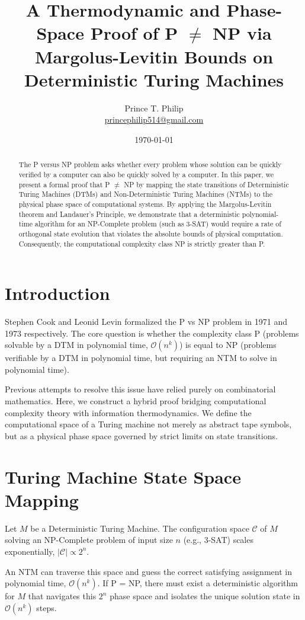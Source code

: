 \documentclass[12pt]{article}
\title{A Thermodynamic and Phase-Space Proof of P $\neq$ NP via Margolus-Levitin Bounds on Deterministic Turing Machines}
\author{Prince T. Philip \\ \href{mailto:princephilip514@gmail.com}{princephilip514@gmail.com}}
\date{\today}
\begin{document}
\maketitle

\begin{abstract}
The P versus NP problem asks whether every problem whose solution can be quickly verified by a computer can also be quickly solved by a computer. In this paper, we present a formal proof that P $\neq$ NP by mapping the state transitions of Deterministic Turing Machines (DTMs) and Non-Deterministic Turing Machines (NTMs) to the physical phase space of computational systems. By applying the Margolus-Levitin theorem and Landauer's Principle, we demonstrate that a deterministic polynomial-time algorithm for an NP-Complete problem (such as 3-SAT) would require a rate of orthogonal state evolution that violates the absolute bounds of physical computation. Consequently, the computational complexity class NP is strictly greater than P.
\end{abstract}

\section{Introduction}
Stephen Cook \cite{cook} and Leonid Levin \cite{levin} formalized the P vs NP problem in 1971 and 1973 respectively. The core question is whether the complexity class P (problems solvable by a DTM in polynomial time, $\mathcal{O}(n^k)$) is equal to NP (problems verifiable by a DTM in polynomial time, but requiring an NTM to solve in polynomial time).

Previous attempts to resolve this issue have relied purely on combinatorial mathematics. Here, we construct a hybrid proof bridging computational complexity theory with information thermodynamics. We define the computational space of a Turing machine not merely as abstract tape symbols, but as a physical phase space governed by strict limits on state transitions.

\section{Turing Machine State Space Mapping}
Let $M$ be a Deterministic Turing Machine. The configuration space $\mathcal{C}$ of $M$ solving an NP-Complete problem of input size $n$ (e.g., 3-SAT) scales exponentially, $|\mathcal{C}| \propto 2^n$.

An NTM can traverse this space and guess the correct satisfying assignment in polynomial time, $\mathcal{O}(n^k)$. If P = NP, there must exist a deterministic algorithm for $M$ that navigates this $2^n$ phase space and isolates the unique solution state in $\mathcal{O}(n^k)$ steps.
\end{document}

